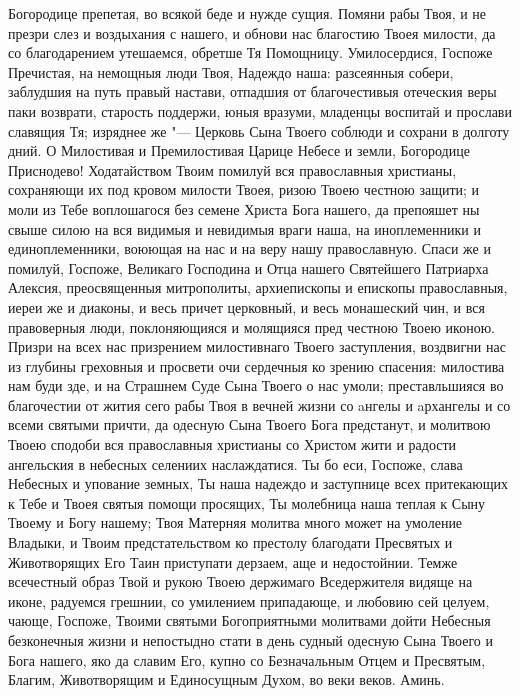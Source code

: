 Богородице препетая, во всякой беде и нужде сущия. Помяни рабы Твоя, и не презри слез и воздыхания с нашего, и обнови нас благостию Твоея милости, да со благодарением утешаемся, обретше Тя Помощницу. Умилосердися, Госпоже Пречистая, на немощныя люди Твоя, Надеждо наша: разсеянныя собери, заблудшия на путь правый настави, отпадшия от благочестивыя отеческия веры паки возврати, старость поддержи, юныя вразуми, младенцы воспитай и прослави славящия Тя; изряднее же "--- Церковь Сына Твоего соблюди и сохрани в долготу дний. О Милостивая и Премилостивая Царице Небесе и земли, Богородице Приснодево! Ходатайством Твоим помилуй вся православныя христианы, сохраняющи их под кровом милости Твоея, ризою Твоею честною защити; и моли из Тебе воплошагося без семене Христа Бога нашего, да препояшет ны свыше силою на вся видимыя и невидимыя враги наша, на иноплеменники и единоплеменники, воюющая на нас и на веру нашу православную. Спаси же и помилуй, Госпоже, Великаго Господина и Отца нашего Святейшего Патриарха Алексия, преосвященныя митрополиты, архиепископы и епископы православныя, иереи же и диаконы, и весь причет церковный, и весь монашеский чин, и вся правоверныя люди, поклоняющияся и молящияся пред честною Твоею иконою. Призри на всех нас призрением милостивнаго Твоего заступления, воздвигни нас из глубины греховныя и просвети очи сердечныя ко зрению спасения: милостива нам буди зде, и на Страшнем Суде Сына Твоего о нас умоли; преставльшияся во благочестии от жития сего рабы Твоя в вечней жизни со aнгелы и aрхангелы и со всеми святыми причти, да одесную Сына Твоего Бога предстанут, и молитвою Твоею сподоби вся православныя христианы со Христом жити и радости ангельския в небесных селениих наслаждатися. Ты бо еси, Госпоже, слава Небесных и упование земных, Ты наша надеждо и заступнице всех притекающих к Тебе и Твоея святыя помощи просящих, Ты молебница наша теплая к Сыну Твоему и Богу нашему; Твоя Матерняя молитва много может на умоление Владыки, и Твоим предстательством ко престолу благодати Пресвятых и Животворящих Его Таин приступати дерзаем, аще и недостойнии. Темже всечестный образ Твой и рукою Твоею держимаго Вседержителя видяще на иконе, радуемся грешнии, со умилением припадающе, и любовию сей целуем, чающе, Госпоже, Твоими святыми Богоприятными молитвами дойти Небесныя безконечныя жизни и непостыдно стати в день судный одесную Сына Твоего и Бога нашего, яко да славим Его, купно со Безначальным Отцем и Пресвятым, Благим, Животворящим и Единосущным Духом, во веки веков. Аминь.


\bigskip\bigskip\mychapterending

